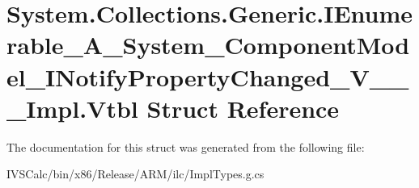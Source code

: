 \hypertarget{struct_system_1_1_collections_1_1_generic_1_1_i_enumerable___a___system___component_model___i_no864a223390872df9b9ee4623c2d0af87}{}\section{System.\+Collections.\+Generic.\+I\+Enumerable\+\_\+\+A\+\_\+\+System\+\_\+\+Component\+Model\+\_\+\+I\+Notify\+Property\+Changed\+\_\+\+V\+\_\+\+\_\+\+\_\+\+Impl.\+Vtbl Struct Reference}
\label{struct_system_1_1_collections_1_1_generic_1_1_i_enumerable___a___system___component_model___i_no864a223390872df9b9ee4623c2d0af87}


The documentation for this struct was generated from the following file\+:\begin{DoxyCompactItemize}
\item 
I\+V\+S\+Calc/bin/x86/\+Release/\+A\+R\+M/ilc/Impl\+Types.\+g.\+cs\end{DoxyCompactItemize}
